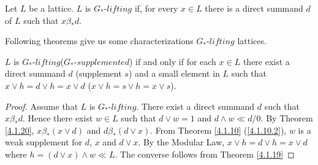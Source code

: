 \documentclass[handout]{beamer}
\begin{document}
\begin{frame}
\begin{definition}
 Let $ L $ be a lattice. $ L $ is $ G_* $-$ lifting $ if, for every $ x \in L $ there is a direct summand $ d $ of $ L $ such that $ x \beta_* d $.
\end{definition}
\end{frame}
\begin{frame}
Following theorems give us some characterizations $ G_* $-$ lifting $ lattices.
\pause
\begin{theorem} \label{4.2.3}
$ L $ is $ G_* $-$ lifting $($ G_* $-$ supplemented $) if and only if for each $ x \in L $ there exist a direct summand $ d $ (supplement $ s $)
and a small element in $ L $ such that $ x \vee h = d \vee h = x \vee d $ ($ x \vee h = s \vee h = x \vee s $).
\end{theorem}
\begingroup
{}
\begin{proof}
Assume that $ L $ is $ G_* $-$ lifting $. There exist a direct summand $ d $ such that $ x \beta_* d $. 
Hence there exist $ w \in L $ such that $ d \vee w = 1 $ and $ d \wedge w \ll d/0 $. 
By Theorem \ref{4.1.20}, $ x \beta_* (x \vee d) $ and $ d \beta_* (d \vee x) $.
From Theorem \ref{4.1.10} (\ref{4.1.10.2}), $ w $ is a weak supplement for $ d $, $ x $ and $ d \vee x $. 
By the Modular Law, $ x \vee h = d \vee h = x \vee d $ where $ h = (d \vee x) \wedge w \ll L $. 
The converse follows from Theorem \ref{4.1.19}
\end{proof}
\endgroup
\end{frame}
\end{document}
